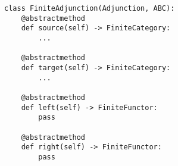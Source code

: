 \par\begin{minipage}{60ex}
\begin{verbatim}
class FiniteAdjunction(Adjunction, ABC):
    @abstractmethod
    def source(self) -> FiniteCategory:
        ...

    @abstractmethod
    def target(self) -> FiniteCategory:
        ...

    @abstractmethod
    def left(self) -> FiniteFunctor:
        pass

    @abstractmethod
    def right(self) -> FiniteFunctor:
        pass
\end{verbatim}
\end{minipage}\par